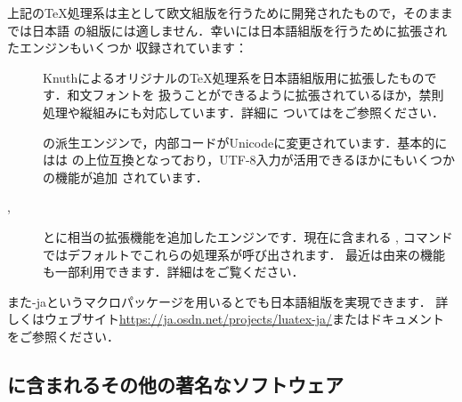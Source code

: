 \documentclass[uplatex,dvipdfmx]{jsarticle}
\begin{document}
%
上記の\TeX 処理系は主として欧文組版を行うために開発されたもので，そのままでは日本語
の組版には適しません．幸い\TL には日本語組版を行うために拡張されたエンジンもいくつか
収録されています：
%
\begin{description}
\item[\pTeX]
Knuthによるオリジナルの\TeX 処理系を日本語組版用に拡張したものです．和文フォントを
扱うことができるように拡張されているほか，禁則処理や縦組みにも対応しています．詳細に
ついてはをご参照ください．

\item[\upTeX]
\pTeX の派生エンジンで，内部コードがUnicodeに変更されています．基本的には\upTeX は
\pTeX の上位互換となっており，UTF-8入力が活用できるほかにもいくつかの機能が追加
されています．

\item[\epTeX, \eupTeX]
\pTeX と\upTeX に\eTeX 相当の拡張機能を追加したエンジンです．現在\TL に含まれる
, コマンドではデフォルトでこれらの処理系が呼び出されます．
最近は\pdfTeX 由来の機能も一部利用できます．詳細はをご覧ください．
\end{description}
%
また\LuaTeX-jaというマクロパッケージを用いると\LuaTeX でも日本語組版を実現できます．
詳しくはウェブサイト\url{https://ja.osdn.net/projects/luatex-ja/}またはドキュメント
をご参照ください．

\subsection{\TL に含まれるその他の著名なソフトウェア}
\end{document}
